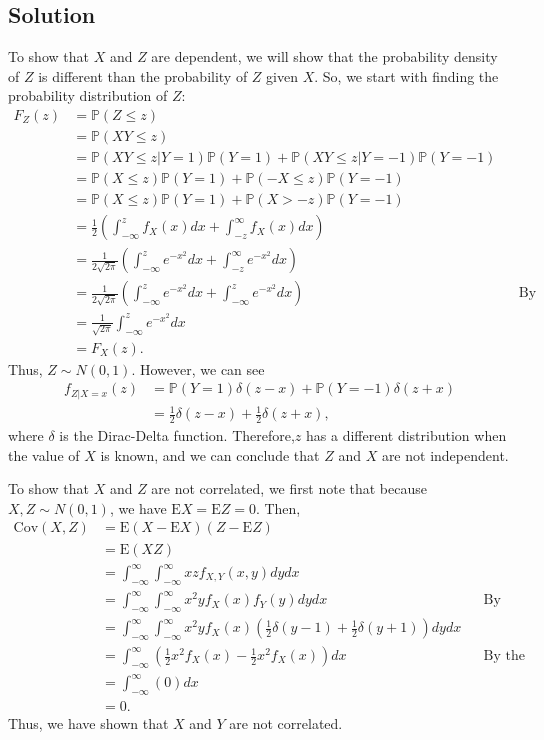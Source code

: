 \documentclass[10pt,a4paper]{article}
\theoremstyle{theorem}
\theoremstyle{definition}
\newcommand{\Prob}{\mathbb{P}}
\begin{document}
\subsection*{Solution} To show that $X$ and $Z$ are dependent, we will show that the probability density of $Z$ is different than the probability of $Z$ given $X$. So, we start with finding the probability distribution of $Z$:
\begin{align*}
F_Z(z) &= \Prob(Z \leq z)\\
&= \Prob(XY \leq z)\\
&= \Prob(XY \leq z| Y = 1) \Prob(Y = 1) + \Prob(XY \leq z| Y = -1) \Prob(Y = -1)\\
&= \Prob(X \leq z) \Prob(Y = 1) + \Prob(-X \leq z) \Prob(Y = -1)\\
&= \Prob(X \leq z) \Prob(Y = 1) + \Prob(X > -z) \Prob(Y = -1)\\
&= \frac{1}{2} \left( \int_{-\infty}^z f_X(x) dx + \int_{-z}^{\infty} f_X(x) dx \right)\\
&= \frac{1}{2 \sqrt{2 \pi}} \left( \int_{-\infty}^z e^{-x^2} dx + \int_{-z}^{\infty} e^{-x^2} dx \right)\\
&= \frac{1}{2 \sqrt{2 \pi}} \left( \int_{-\infty}^z e^{-x^2} dx + \int_{-\infty}^{z} e^{-x^2} dx \right) && \text{By symmetry of gaussian function}\\
&= \frac{1}{\sqrt{2 \pi}}\int_{-\infty}^z e^{-x^2} dx \\
&= F_X(z).
\end{align*}
Thus, $Z \sim N(0, 1)$. However, we can see
\begin{align*}
f_{Z|X = x}(z) &= \Prob(Y = 1) \delta(z - x) + \Prob(Y=-1) \delta(z + x) \\
&= \frac{1}{2} \delta(z - x) + \frac{1}{2} \delta(z + x),
\end{align*}
where $\delta$ is the Dirac-Delta function. Therefore,$z$ has a different distribution when the value of $X$ is known, and we can conclude that $Z$ and $X$ are not independent. 

To show that $X$ and $Z$ are not correlated, we first note that because $X,Z \sim N(0, 1)$, we have $\text{E}X = \text{E}Z = 0$. Then,
\begin{align*}
\text{Cov}(X,Z) &= \text{E}(X - \text{E}X)(Z - \text{E}Z)\\
&= \text{E}(XZ)\\
&= \int_{-\infty}^{\infty} \int_{-\infty}^{\infty} xz f_{X, Y}(x, y) dy dx\\
&= \int_{-\infty}^{\infty} \int_{-\infty}^{\infty} x^2 y f_X(x) f_Y(y) dy dx &&\text{By independence}\\
&= \int_{-\infty}^{\infty} \int_{-\infty}^{\infty} x^2 y f_X(x) (\frac{1}{2}\delta(y - 1) + \frac{1}{2}\delta(y + 1))dy dx\\
&= \int_{-\infty}^{\infty} \left(\frac{1}{2} x^2 f_X(x) - \frac{1}{2} x^2 f_X(x) \right)dx &&\text{By the sifting property of the Dirac-Delta}\\
&= \int_{-\infty}^{\infty} (0) dx\\
&= 0.
\end{align*}
Thus, we have shown that $X$ and $Y$ are not correlated.
\end{document}
